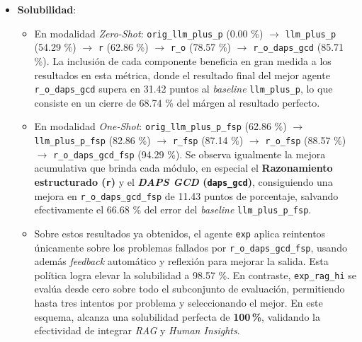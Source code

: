 \begin{itemize}
\begin{itemize}
	\end{itemize}
\item \textbf{Solubilidad}:
	\begin{itemize}
	\item En modalidad \textit{Zero-Shot}: \texttt{orig\_llm\_plus\_p} (\textcolor[rgb]{0.0,0.00,0.0}{0.00 \%}) $\rightarrow$ \texttt{llm\_plus\_p} (\textcolor[rgb]{0.0,0.54,0.0}{54.29 \%}) $\rightarrow$ \texttt{r} (\textcolor[rgb]{0.0,0.63,0.0}{62.86 \%}) $\rightarrow$ \texttt{r\_o} (\textcolor[rgb]{0.0,0.79,0.0}{78.57 \%}) $\rightarrow$ \texttt{r\_o\_daps\_gcd} (\textcolor[rgb]{0.0,0.86,0.0}{85.71 \%}). La inclusión de cada componente beneficia en gran medida a los resultados en esta métrica, donde el resultado final del mejor agente \texttt{r\_o\_daps\_gcd} supera en \textcolor[rgb]{0.0,0.69,0.0}{31.42} puntos al \textit{baseline} \texttt{llm\_plus\_p}, lo que consiste en un cierre de \textcolor[rgb]{0.0,0.69,0.0}{68.74 \%} del márgen al resultado perfecto.
	\item En modalidad \textit{One-Shot}: \texttt{orig\_llm\_plus\_p\_fsp} (\textcolor[rgb]{0.0,0.63,0.0}{62.86 \%}) $\rightarrow$ \texttt{llm\_plus\_p\_fsp} (\textcolor[rgb]{0.0,0.83,0.0}{82.86 \%}) $\rightarrow$ \texttt{r\_fsp} (\textcolor[rgb]{0.0,0.87,0.0}{87.14 \%}) $\rightarrow$ \texttt{r\_o\_fsp} (\textcolor[rgb]{0.0,0.89,0.0}{88.57 \%}) $\rightarrow$ \texttt{r\_o\_daps\_gcd\_fsp} (\textcolor[rgb]{0.0,0.94,0.0}{94.29 \%}). Se observa igualmente la mejora acumulativa que brinda cada módulo, en especial el \textbf{Razonamiento estructurado (\texttt{r})} y el \textbf{\textit{DAPS GCD} (\texttt{daps\_gcd})}, consiguiendo una mejora en \texttt{r\_o\_daps\_gcd\_fsp} de \textcolor[rgb]{0.0,0.67,0.0}{11.43} puntos de porcentaje, salvando efectivamente el \textcolor[rgb]{0.0,0.67,0.0}{66.68 \%} del error del \textit{baseline} \texttt{llm\_plus\_p\_fsp}. 
	\item Sobre estos resultados ya obtenidos, el agente \texttt{exp} aplica reintentos únicamente sobre los problemas fallados por \texttt{r\_o\_daps\_gcd\_fsp}, usando además \textit{feedback} automático y reflexión para mejorar la salida. Esta política logra elevar la solubilidad a \textcolor[rgb]{0.0,0.98,0.0}{98.57 \%}. En contraste, \texttt{exp\_rag\_hi} se evalúa desde cero sobre todo el subconjunto de evaluación, permitiendo hasta tres intentos por problema y seleccionando el mejor. En este esquema, alcanza una solubilidad perfecta de \textbf{\textcolor[rgb]{0.0,1.0,0.0}{100\,\%}}, validando la efectividad de integrar \textit{RAG} y \textit{Human Insights}.


\end{itemize}
\end{itemize}
